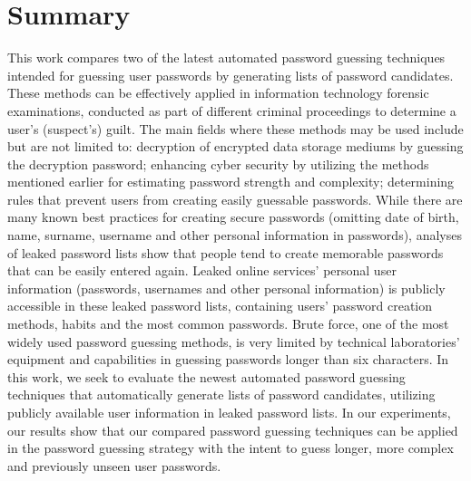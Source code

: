 \documentclass{VUMIFInfBakalaurinis}
\begin{document}
\section{Summary}
This work compares two of the latest automated password guessing techniques 
intended for guessing user passwords by generating lists of password candidates. 
These methods can be effectively applied in information technology forensic 
examinations, conducted as part of different criminal proceedings to determine a 
user's (suspect's) guilt. The main fields where these methods may be used 
include but are not limited to: decryption of encrypted data storage mediums by 
guessing the decryption password; enhancing cyber security by utilizing the 
methods mentioned earlier for estimating password strength and complexity; 
determining rules that prevent users from creating easily guessable passwords. 
While there are many known best practices for creating secure passwords 
(omitting date of birth, name, surname, username and other personal information 
in passwords), analyses of leaked password lists show that people tend to create 
memorable passwords that can be easily entered again. Leaked online services' 
personal user information (passwords, usernames and other personal information) 
is publicly accessible in these leaked password lists, containing users' 
password creation methods, habits and the most common passwords. Brute force, 
one of the most widely used password guessing methods, is very limited by 
technical laboratories' equipment and capabilities in guessing passwords longer 
than six characters. In this work, we seek to evaluate the newest automated 
password guessing techniques that automatically generate lists of password 
candidates, utilizing publicly available user information in leaked password 
lists. In our experiments, our results show that our compared password guessing 
techniques can be applied in the password guessing strategy with the intent to 
guess longer, more complex and previously unseen user passwords.
\end{document}
